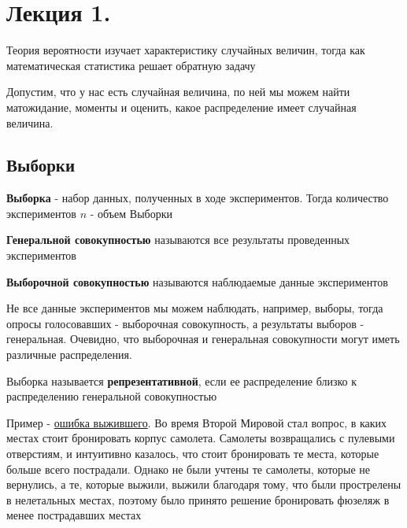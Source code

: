 \documentclass[12pt]{article}
\begin{document}
    \tableofcontents
    \clearpage






\section{Лекция 1.}

Теория вероятности изучает характеристику случайных величин, тогда как математическая статистика решает обратную задачу

Допустим, что у нас есть случайная величина, по ней мы можем найти матожидание, моменты и оценить,
какое распределение имеет случайная величина. 

\subsection{Выборки}

\Def \textbf{Выборка} - набор данных, полученных в ходе экспериментов. Тогда количество экспериментов $n$ - объем Выборки

\Defs \textbf{Генеральной совокупностью} называются все результаты проведенных экспериментов

\Defs \textbf{Выборочной совокупностью} называются наблюдаемые данные экспериментов

Не все данные экспериментов мы можем наблюдать, например, выборы, тогда опросы голосовавших - выборочная совокупность, а
результаты выборов - генеральная. Очевидно, что выборочная и генеральная совокупности могут иметь различные распределения.

\Defs Выборка называется \textbf{репрезентативной}, если ее распределение близко к распределению генеральной совокупностью

Пример - \href{https://ru.wikipedia.org/wiki/%D0%A1%D0%B8%D1%81%D1%82%D0%B5%D0%BC%D0%B0%D1%82%D0%B8%D1%87%D0%B5%D1%81%D0%BA%D0%B0%D1%8F_%D0%BE%D1%88%D0%B8%D0%B1%D0%BA%D0%B0_%D0%B2%D1%8B%D0%B6%D0%B8%D0%B2%D1%88%D0%B5%D0%B3%D0%BE}{ошибка выжившего}. Во время Второй Мировой стал вопрос, в каких местах стоит бронировать корпус самолета. Самолеты 
возвращались с пулевыми отверстиям, и интуитивно казалось, что стоит бронировать те места, которые больше
всего пострадали. Однако не были учтены те самолеты, которые не вернулись, а те, которые выжили, выжили благодаря тому, что были 
прострелены в нелетальных местах, поэтому было принято решение бронировать фюзеляж в менее пострадавших местах
\end{document}
